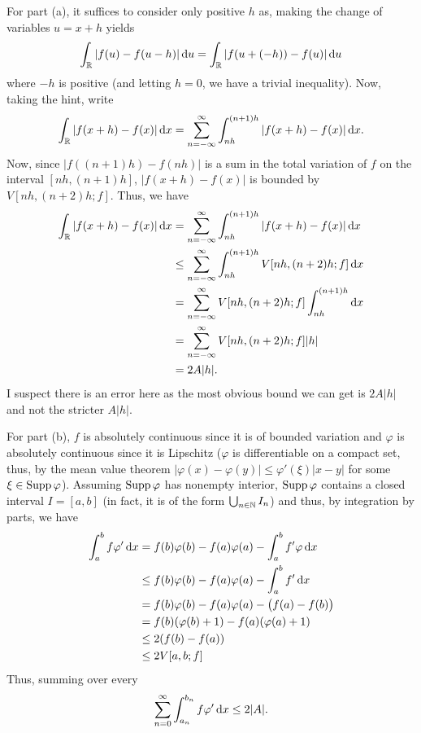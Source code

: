 \begin{solution}
  For part (a), it suffices to consider only positive \(h\) as, making the
  change of variables \(u=x+h\) yields
  \[
    \int_{\mathbb{R}} |f(u)-f(u-h)|\mathop{}\!\mathrm{d} u=
    \int_{\mathbb{R}} |f(u+(-h))-f(u)|\mathop{}\!\mathrm{d} u
  \]
  where \(-h\) is positive (and letting \(h=0\), we have a trivial
  inequality). Now, taking the hint, write
  \[
    \int_{\bbR} |f(x+h)-f(x)|\diff x=%
    \sum_{n=-\infty}^\infty\int_{nh}^{(n+1)h}|f(x+h)-f(x)|\diff x.
  \]
  Now, since \(|f((n+1)h)-f(nh)|\) is a sum in the total variation of \(f\)
  on the interval \([nh,(n+1)h]\), \(|f(x+h)-f(x)|\) is bounded by
  \(V[nh,(n+2)h;f]\). Thus, we have
  \begin{align*}
    \int_{\mathbb{R}} |f(x+h)-f(x)|\mathop{}\!\mathrm{d} x
    &=\sum_{n=-\infty}^\infty\int_{nh}^{(n+1)h}|f(x+h)-f(x)|\mathop{}\!\mathrm{d} x\\
    &\leq\sum_{n=-\infty}^\infty\int_{nh}^{(n+1)h}V[nh,(n+2)h;f]\mathop{}\!\mathrm{d} x\\
    &=\sum_{n=-\infty}^\infty V[nh,(n+2)h;f]\int_{nh}^{(n+1)h}\mathop{}\!\mathrm{d} x\\
    &=\sum_{n=-\infty}^\infty V[nh,(n+2)h;f]|h|\\
    &=2A|h|.
  \end{align*}
  I suspect there is an error here as the most obvious bound we can get is
  \(2A|h|\) and not the stricter \(A|h|\).

  For part (b), \(f\) is absolutely continuous since it is of bounded
  variation and \(\varphi\) is absolutely continuous since it is Lipschitz
  (\(\varphi\) is differentiable on a compact set, thus, by the mean value
  theorem \(|\varphi(x)-\varphi(y)|\leq \varphi'(\xi)|x-y|\) for some
  \(\xi\in\operatorname{Supp}\varphi\)). Assuming \(\operatorname{Supp}\varphi\) has nonempty interior,
  \(\operatorname{Supp}\varphi\) contains a closed interval \(I=[a,b]\) (in fact, it is
  of the form \(\bigcup_{n\in\mathbb{N}} I_n\)) and thus, by integration by
  parts, we have
  \begin{align*}
    \int_a^b f\varphi'\diff x%
    &=f(b)\varphi(b)-f(a)\varphi(a)
      -\int_a^b f'\varphi\diff x\\
    &\leq f(b)\varphi(b)-f(a)\varphi(a)
      -\int_a^b f'\diff x\\
    &=f(b)\varphi(b)-f(a)\varphi(a)
      -\bigl(f(a)-f(b)\bigr)\\
    &=f(b)(\varphi(b)+1)-f(a)(\varphi(a)+1)\\
    &\leq 2(f(b)-f(a))\\
    &\leq 2V[a,b;f]
  \end{align*}
  Thus, summing over every
  \[
    \sum_{n=0}^\infty \int_{a_n}^{b_n} f\varphi'\mathop{}\!\mathrm{d} x\leq 2|A|.
  \]
\end{solution}

